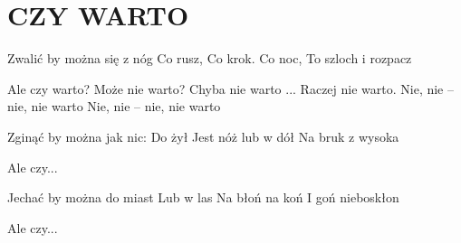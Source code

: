 \documentclass[../../../songbook.tex]{subfiles}
\begin{document}
\TabPositions{8cm} %
\section*{CZY WARTO}
{}
\vspace{0.5cm}
Zwalić by można się z nóg	 \newline	 
Co rusz, 					 \newline	 
Co krok. Co noc, 			 \newline	 
To szloch i rozpacz 		 \newline	 

\-\hspace{1cm} Ale czy warto?  \newline
\-\hspace{1cm} Może nie warto?  \newline	
\-\hspace{1cm} Chyba nie warto ...  \newline
\-\hspace{1cm} Raczej nie warto. 			 \newline	
\-\hspace{1cm} Nie, nie – nie, nie warto  \newline
\-\hspace{1cm} Nie, nie – nie, nie warto  \newline	

Zginąć by można jak nic: \newline
Do żył \newline
Jest nóż lub w dół \newline
Na bruk z wysoka \newline

\-\hspace{1cm} Ale czy...  \newline

Jechać by można do miast   \newline
Lub w las  \newline
Na błoń na koń  \newline
I goń nieboskłon  \newline

\-\hspace{1cm} Ale czy...
\end{document}

